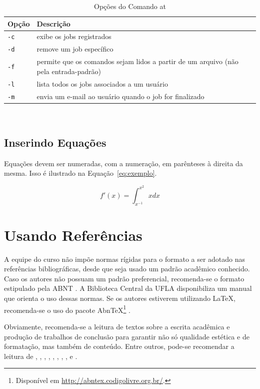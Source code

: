 \begin{table}
\caption{Opções do Comando {\ttfamily at}}
\label{tab:maisum}
\begin{center}
  \small
  \begin{tabular}{l|p{9cm}}
    \hline 
    \rowcolor[gray]{.9}
    \bf Opção & \bf Descrição\\
    \hline
    \hline 
    \tt -c & exibe os jobs registrados\\
    \tt -d & remove um job específico\\
    \tt -f & permite que os comandos sejam lidos a partir de um arquivo (não pela
    entrada-padrão)\\
    \tt -l & lista todos os jobs associados a um usuário\\
    \tt -m & envia um e-mail ao usuário quando o job for finalizado\\
    \hline \end{tabular}\\
\end{center}
\end{table}

\subsection{Inserindo Equações}

Equações devem ser numeradas, com a numeração, em parênteses à direita da mesma. Isso é ilustrado na Equação~\ref{eq:exemplo}.

\begin{equation}
\label{eq:exemplo}
f'(x) = \int^{x^2}_{x^{-1}} xdx 
\end{equation}


\section{Usando Referências}
A equipe do curso não impõe normas rígidas para o formato a ser adotado nas referências bibliográficas, desde que seja usado um padrão acadêmico conhecido. Caso os autores não possuam um padrão preferencial, recomenda-se o formato estipulado pela ABNT \cite{NBR6023:2002}. A Biblioteca Central da UFLA disponibiliza um manual \cite{BIBUFLA2001} que orienta o uso dessas normas. Se os autores estiverem utilizando \LaTeX, recomenda-se o uso do pacote Abn\TeX\footnote{Disponível em \url{http://abntex.codigolivre.org.br/}.} \cite{Weber2003}. 

Obviamente, recomenda-se a leitura de textos sobre a escrita acadêmica e produção de trabalhos de conclusão para garantir não só qualidade estética e de formatação, mas também de conteúdo. Entre outros, pode-se recomendar a leitura de \cite{Silva2005}, \cite{Martins2000}, \cite{Gil2002}, \cite{Franca2001}, \cite{Eco1996}, \cite{Moura1998}, \cite{Booth2000}, \cite{Hexsel2004}, \cite{Porto2002} e \cite{Henz2003}. 


